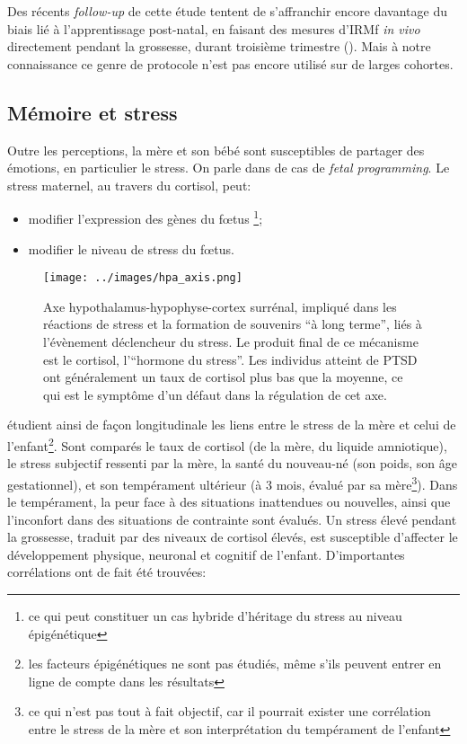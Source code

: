 \documentclass[french]{article}
\begin{document}
				Des récents \textit{follow-up} de cette étude tentent de s'affranchir encore davantage du biais lié à l'apprentissage post-natal, en faisant des mesures d'IRMf \textit{in vivo} directement pendant la grossesse, durant troisième trimestre (\cite{jardri2012}). Mais à notre connaissance ce genre de protocole n'est pas encore utilisé sur de larges cohortes.
				
			\subsection{Mémoire et stress}\label{stress}
				Outre les perceptions, la mère et son bébé sont susceptibles de partager des émotions, en particulier le stress. On parle dans de cas de \textit{fetal programming}. Le stress maternel, au travers du cortisol, peut:
				\begin{itemize}
					\item modifier l'expression des gènes du fœtus \footnote{ce qui peut constituer un cas hybride d'héritage du stress au niveau épigénétique};
					\item modifier le niveau de stress du fœtus.
				\end{itemize} \vspace{3mm}
				\begin{figure}[H]
					\centering
					\texttt{[image: ../images/hpa\_axis.png]}
					\caption{Axe hypothalamus-hypophyse-cortex surrénal, impliqué dans les réactions de stress et la formation de souvenirs ``à long terme'', liés à l'évènement déclencheur du stress. Le produit final de ce mécanisme est le cortisol, l'``hormone du stress''. Les individus atteint de PTSD ont généralement un taux de cortisol plus bas que la moyenne, ce qui est le symptôme d'un défaut dans la régulation de cet axe.}
				\end{figure}
				\cite{baibazarova2013} étudient ainsi de façon longitudinale les liens entre le stress de la mère et celui de l'enfant\footnote{les facteurs épigénétiques ne sont pas étudiés, même s'ils peuvent entrer en ligne de compte dans les résultats}. Sont comparés le taux de cortisol (de la mère, du liquide amniotique), le stress subjectif ressenti par la mère, la santé du nouveau-né (son poids, son âge gestationnel), et son tempérament ultérieur (à 3 mois, évalué par sa mère\footnote{ce qui n'est pas tout à fait objectif, car il pourrait exister une corrélation entre le stress de la mère et son interprétation du tempérament de l'enfant}). Dans le tempérament, la peur face à des situations inattendues ou nouvelles, ainsi que l'inconfort dans des situations de contrainte sont évalués. Un stress élevé pendant la grossesse, traduit par des niveaux de cortisol élevés, est susceptible d'affecter le développement physique, neuronal et cognitif de l'enfant. D'importantes corrélations ont de fait été trouvées:
\end{document}
